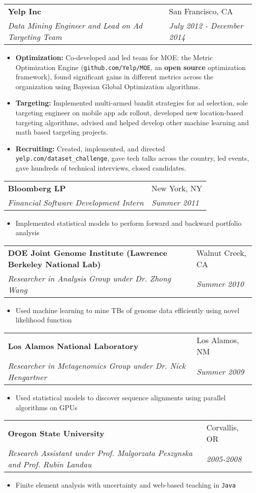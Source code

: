 \documentclass[letterpaper, 11pt]{article}
\makeatletter
\newcommand{\entry}[4]{%
  \begin{tabularx}{\linewidth}{@{}Xl@{}}
    \textbf{#1} & #2          \\
    \textit{#3} & \textit{#4} \\
  \end{tabularx}
}
\makeatother
\begin{document}
  \entry{Yelp Inc}{San Francisco, CA}{Data Mining Engineer and Lead on Ad Targeting Team}{July 2012 - December 2014}
  \begin{itemize}
    \item{{\bf Optimization:} Co-developed and led team for MOE: the Metric Optimization Engine (\texttt{github.com/Yelp/MOE}, an \textbf{open source} optimization framework), found significant gains in different metrics across the organization using Bayesian Global Optimization algorithms.}
    \item{{\bf Targeting:} Implemented multi-armed bandit strategies for ad selection, sole targeting engineer on mobile app ads rollout, developed new location-based targeting algorithms, advised and helped develop other machine learning and math based targeting projects.}
    \item{{\bf Recruiting:} Created, implemented, and directed \texttt{yelp.com/dataset\_challenge}, gave tech talks across the country, led events, gave hundreds of technical interviews, closed candidates.}
  \end{itemize}

  \entry{Bloomberg LP}{New York, NY}{Financial Software Development Intern}{Summer 2011}
  \begin{itemize}
    \item{Implemented statistical models to perform forward and backward portfolio analysis}
  \end{itemize}

  \entry{DOE Joint Genome Institute (Lawrence Berkeley National Lab)}{Walnut Creek, CA}{Researcher in Analysis Group under Dr. Zhong Wang}{Summer 2010}
  \begin{itemize}
    \item{Used machine learning to mine TBs of genome data efficiently using novel likelihood function}
  \end{itemize}

  \entry{Los Alamos National Laboratory}{Los Alamos, NM}{Researcher in Metagenomics Group under Dr. Nick Hengartner}{Summer 2009}
  \begin{itemize}
    \item{Used statistical models to discover sequence alignments using parallel algorithms on GPUs}
  \end{itemize}

  \entry{Oregon State University}{Corvallis, OR}{Research Assistant under Prof. Malgorzata Peszynska and Prof. Rubin Landau}{2005-2008}
  \begin{itemize}
    \item{Finite element analysis with uncertainty and web-based teaching in \texttt{Java}}
  \end{itemize}
\end{document}
